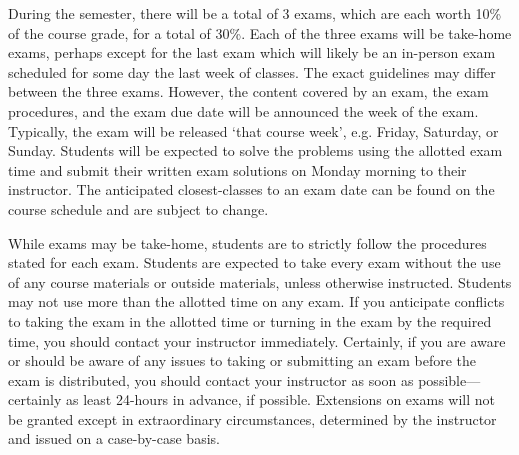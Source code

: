 \documentclass[11pt,letterpaper]{article}
\begin{document}
During the semester, there will be a total of 3 exams, which are each worth 10\% of the course grade, for a total of 30\%. Each of the three exams will be take-home exams, perhaps except for the last exam which will likely be an in-person exam scheduled for some day the last week of classes. The exact guidelines may differ between the three exams. However, the content covered by an exam, the exam procedures, and the exam due date will be announced the week of the exam. Typically, the exam will be released `that course week', e.g. Friday, Saturday, or Sunday. Students will be expected to solve the problems using the allotted exam time and submit their written exam solutions on Monday morning to their instructor. The anticipated closest-classes to an exam date can be found on the course schedule and are subject to change. \pspace

While exams may be take-home, students are to strictly follow the procedures stated for each exam. Students are expected to take every exam without the use of any course materials or outside materials, unless otherwise instructed. Students may not use more than the allotted time on any exam. If you anticipate conflicts to taking the exam in the allotted time or turning in the exam by the required time, you should contact your instructor immediately. Certainly, if you are aware or should be aware of any issues to taking or submitting an exam before the exam is distributed, you should contact your instructor as soon as possible---certainly as least 24-hours in advance, if possible. Extensions on exams will not be granted except in extraordinary circumstances, determined by the instructor and issued on a case-by-case basis. \sectionbreak
\end{document}
